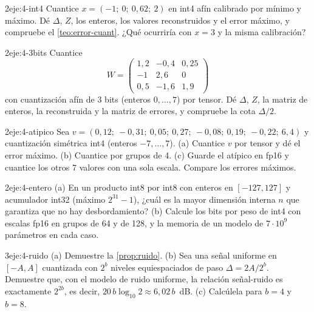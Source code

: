 \begin{ejercicio}{2}{eje:4-int4}
Cuantice $x=(-1;\allowbreak\ 0;\allowbreak\ 0{,}62;\allowbreak\ 2)$ en int4 afín calibrado por mínimo y máximo. Dé $\Delta$, $Z$, los enteros, los valores reconstruidos y el error máximo, y compruebe el \cref{teo:error-cuant}. ¿Qué ocurriría con $x=3$ y la misma calibración?
\end{ejercicio}

\begin{ejercicio}{2}{eje:4-3bits}
Cuantice
\[
W=\begin{pmatrix}1{,}2 & -0{,}4 & 0{,}25\\ -1 & 2{,}6 & 0\\ 0{,}5 & -1{,}6 & 1{,}9\end{pmatrix}
\]
con cuantización afín de 3 bits (enteros $0,\dots,7$) por tensor. Dé $\Delta$, $Z$, la matriz de enteros, la reconstruida y la matriz de errores, y compruebe la cota $\Delta/2$.
\end{ejercicio}

\begin{ejercicio}{2}{eje:4-atipico}
Sea $v=(0{,}12;\allowbreak\ -0{,}31;\allowbreak\ 0{,}05;\allowbreak\ 0{,}27;\allowbreak\ -0{,}08;\allowbreak\ 0{,}19;\allowbreak\ -0{,}22;\allowbreak\ 6{,}4)$ y cuantización simétrica int4 (enteros $-7,\dots,7$). (a) Cuantice $v$ por tensor y dé el error máximo. (b) Cuantice por grupos de 4. (c) Guarde el atípico en fp16 y cuantice los otros 7 valores con una sola escala. Compare los errores máximos.
\end{ejercicio}

\begin{ejercicio}{2}{eje:4-entero}
(a) En un producto int8 por int8 con enteros en $[-127,127]$ y acumulador int32 (máximo $2^{31}-1$), ¿cuál es la mayor dimensión interna $n$ que garantiza que no hay desbordamiento? (b) Calcule los bits por peso de int4 con escalas fp16 en grupos de 64 y de 128, y la memoria de un modelo de $7\cdot 10^{9}$ parámetros en cada caso.
\end{ejercicio}

\begin{ejercicio}{3}{eje:4-ruido}
(a) Demuestre la \cref{prop:ruido}. (b) Sea una señal uniforme en $[-A,A]$ cuantizada con $2^{b}$ niveles equiespaciados de paso $\Delta=2A/2^{b}$. Demuestre que, con el modelo de ruido uniforme, la relación señal-ruido es exactamente $2^{2b}$, es decir, $20\,b\log_{10}2\approx 6{,}02\,b$~dB. (c) Calcúlela para $b=4$ y $b=8$.
\end{ejercicio}

